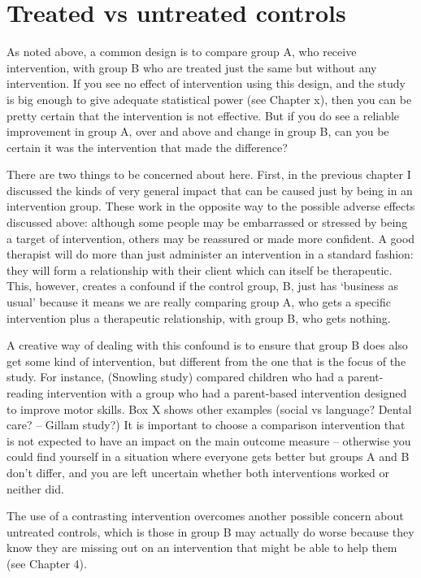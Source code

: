 \documentclass[]{book}
\begin{document}
\hypertarget{treated-vs-untreated-controls}{%
\section{Treated vs untreated controls}\label{treated-vs-untreated-controls}}

As noted above, a common design is to compare group A, who receive intervention, with group B who are treated just the same but without any intervention. If you see no effect of intervention using this design, and the study is big enough to give adequate statistical power (see Chapter x), then you can be pretty certain that the intervention is not effective. But if you do see a reliable improvement in group A, over and above and change in group B, can you be certain it was the intervention that made the difference?

There are two things to be concerned about here. First, in the previous chapter I discussed the kinds of very general impact that can be caused just by being in an intervention group. These work in the opposite way to the possible adverse effects discussed above: although some people may be embarrassed or stressed by being a target of intervention, others may be reassured or made more confident. A good therapist will do more than just administer an intervention in a standard fashion: they will form a relationship with their client which can itself be therapeutic. This, however, creates a confound if the control group, B, just has `business as usual' because it means we are really comparing group A, who gets a specific intervention plus a therapeutic relationship, with group B, who gets nothing.

A creative way of dealing with this confound is to ensure that group B does also get some kind of intervention, but different from the one that is the focus of the study. For instance, (Snowling study) compared children who had a parent-reading intervention with a group who had a parent-based intervention designed to improve motor skills. Box X shows other examples (social vs language? Dental care? -- Gillam study?) It is important to choose a comparison intervention that is not expected to have an impact on the main outcome measure -- otherwise you could find yourself in a situation where everyone gets better but groups A and B don't differ, and you are left uncertain whether both interventions worked or neither did.

The use of a contrasting intervention overcomes another possible concern about untreated controls, which is those in group B may actually do worse because they know they are missing out on an intervention that might be able to help them (see Chapter 4).
\end{document}
